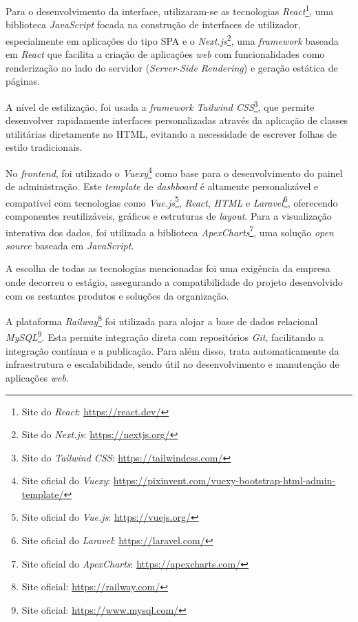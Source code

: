 Para o desenvolvimento da interface, utilizaram-se as tecnologias \textit{React}\footnote{Site do \textit{React}: \url{https://react.dev/}}, uma biblioteca \textit{JavaScript} focada na construção de interfaces de utilizador, especialmente em aplicações do tipo \gls{SPA} e o \textit{Next.js}\footnote{Site do \textit{Next.js}: \url{https://nextjs.org/}}, uma \textit{framework} baseada em \textit{React} que facilita a criação de aplicações \textit{web} com funcionalidades como renderização no lado do servidor (\textit{Server-Side Rendering}) e geração estática de páginas.

A nível de estilização, foi usada a \textit{framework} \textit{Tailwind CSS}\footnote{Site do \textit{Tailwind CSS}: \url{https://tailwindcss.com/}}, que permite desenvolver rapidamente interfaces personalizadas através da aplicação de classes utilitárias diretamente no HTML, evitando a necessidade de escrever folhas de estilo tradicionais.

No \textit{frontend}, foi utilizado o \textit{Vuexy}\footnote{Site oficial do \textit{Vuexy}: \url{https://pixinvent.com/vuexy-bootstrap-html-admin-template/}} como base para o desenvolvimento do painel de administração. Este \textit{template} de \textit{dashboard} é altamente personalizável e compatível com tecnologias como \textit{Vue.js}\footnote{Site oficial do \textit{Vue.js}: \url{https://vuejs.org/}}, \textit{React}, \textit{HTML} e \textit{Laravel}\footnote{Site oficial do \textit{Laravel}: \url{https://laravel.com/}}, oferecendo componentes reutilizáveis, gráficos e estruturas de \textit{layout}. Para a visualização interativa dos dados, foi utilizada a biblioteca \textit{ApexCharts}\footnote{Site oficial do \textit{ApexCharts}: \url{https://apexcharts.com/}}, uma solução \textit{open source} baseada em \textit{JavaScript}.

A escolha de todas as tecnologias mencionadas foi uma exigência da empresa onde decorreu o estágio, assegurando a compatibilidade do projeto desenvolvido com os restantes produtos e soluções da organização.

A plataforma \textit{Railway}\footnote{Site oficial: \url{https://railway.com/}} foi utilizada para alojar a base de dados relacional \textit{MySQL}\footnote{Site oficial: \url{https://www.mysql.com/}}. Esta permite integração direta com repositórios \textit{Git}, facilitando a integração contínua e a publicação. Para além disso, trata automaticamente da infraestrutura e escalabilidade, sendo útil no desenvolvimento e manutenção de aplicações \textit{web}.

